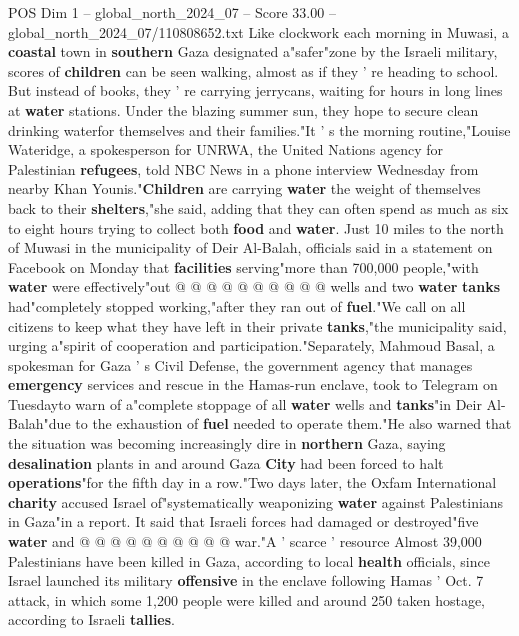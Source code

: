 \begin{textsample}{POS Dim 1 – global\_north\_2024\_07 – Score 33.00 – global\_north\_2024\_07/110808652.txt}  \label{ex:f1_pos_386}
Like clockwork each morning in Muwasi, a \textbf{coastal} town in \textbf{southern} Gaza designated a"safer"zone by the Israeli military, scores of \textbf{children} can be seen walking, almost as if they ' re heading to school.
But instead of books, they ' re carrying jerrycans, waiting for hours in long lines at \textbf{water} stations.
Under the blazing summer sun, they hope to secure clean drinking waterfor themselves and their families."It ' s the morning routine,"Louise Wateridge, a spokesperson for UNRWA, the United Nations agency for Palestinian \textbf{refugees}, told NBC News in a phone interview Wednesday from nearby Khan Younis."\textbf{Children} are carrying \textbf{water} the weight of themselves back to their \textbf{shelters},"she said, adding that they can often spend as much as six to eight hours trying to collect both \textbf{food} and \textbf{water}.
Just 10 miles to the north of Muwasi in the municipality of Deir Al-Balah, officials said in a statement on Facebook on Monday that \textbf{facilities} serving"more than 700,000 people,"with \textbf{water} were effectively"out @ @ @ @ @ @ @ @ @ @ wells and two \textbf{water} \textbf{tanks} had"completely stopped working,"after they ran out of \textbf{fuel}."We call on all citizens to keep what they have left in their private \textbf{tanks},"the municipality said, urging a"spirit of cooperation and participation."Separately, Mahmoud Basal, a spokesman for Gaza ' s Civil Defense, the government agency that manages \textbf{emergency} services and rescue in the Hamas-run enclave, took to Telegram on Tuesdayto warn of a"complete stoppage of all \textbf{water} wells and \textbf{tanks}"in Deir Al-Balah"due to the exhaustion of \textbf{fuel} needed to operate them."He also warned that the situation was becoming increasingly dire in \textbf{northern} Gaza, saying \textbf{desalination} plants in and around Gaza \textbf{City} had been forced to halt \textbf{operations}"for the fifth day in a row."Two days later, the Oxfam International \textbf{charity} accused Israel of"systematically weaponizing \textbf{water} against Palestinians in Gaza"in a report.
It said that Israeli forces had damaged or destroyed"five \textbf{water} and @ @ @ @ @ @ @ @ @ @ war."A ' scarce ' resource Almost 39,000 Palestinians have been killed in Gaza, according to local \textbf{health} officials, since Israel launched its military \textbf{offensive} in the enclave following Hamas ' Oct. 7 attack, in which some 1,200 people were killed and around 250 taken hostage, according to Israeli \textbf{tallies}.

\end{textsample}
